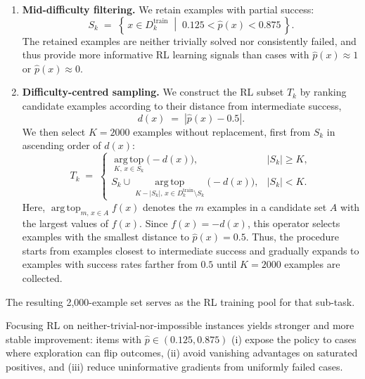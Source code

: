 \begin{enumerate}
      \item \textbf{Mid-difficulty filtering.} We retain examples with partial success:
      \begin{equation}
          S_k \;=\; \left\{\,x \in D^{\mathrm{train}}_{k} \;\middle|\; 0.125 < \hat p(x) < 0.875 \,
          \right\}.
      \end{equation}
      The retained examples are neither trivially solved nor consistently failed, and thus provide more informative RL learning signals than cases with \(\hat p(x)\approx 1\) or \(\hat p(x)\approx 0\).
    \item \textbf{Difficulty-centred sampling.} We construct the RL subset \(T_k\) by ranking candidate examples according to their distance from intermediate success,
    \begin{equation}
        d(x) \;=\; \left|\hat p(x)-0.5\right|.
    \end{equation}
    We then select \(K=2000\) examples without replacement, first from \(S_k\) in ascending order of \(d(x)\):
    \begin{equation}
        T_k \;=\;
        \begin{cases}
        \operatorname*{arg\,top}_{K,\,x \in S_k} \bigl(-d(x)\bigr),
        & |S_k| \geq K, \\[4pt]
        S_k \cup
        \operatorname*{arg\,top}_{K-|S_k|,\,x \in D^{\mathrm{train}}_{k}\setminus S_k}
        \bigl(-d(x)\bigr),
        & |S_k| < K .
        \end{cases}
    \end{equation}
    Here, \(\operatorname*{arg\,top}_{m,\,x\in A} f(x)\) denotes the \(m\) examples in a candidate set \(A\) with the largest values of \(f(x)\). Since \(f(x)=-d(x)\), this operator selects examples with the smallest distance to \(\hat p(x)=0.5\). Thus, the procedure starts from examples closest to intermediate success and gradually expands to examples with success rates farther from \(0.5\) until \(K=2000\) examples are collected.
\end{enumerate}

The resulting 2,000-example set serves as the RL training pool for that sub-task.

Focusing RL on neither-trivial-nor-impossible instances yields stronger and more stable improvement: items with \(\hat p \in (0.125,0.875)\) (i) expose the policy to cases where exploration can flip outcomes, (ii) avoid vanishing advantages on saturated positives, and (iii) reduce uninformative gradients from uniformly failed cases. 

